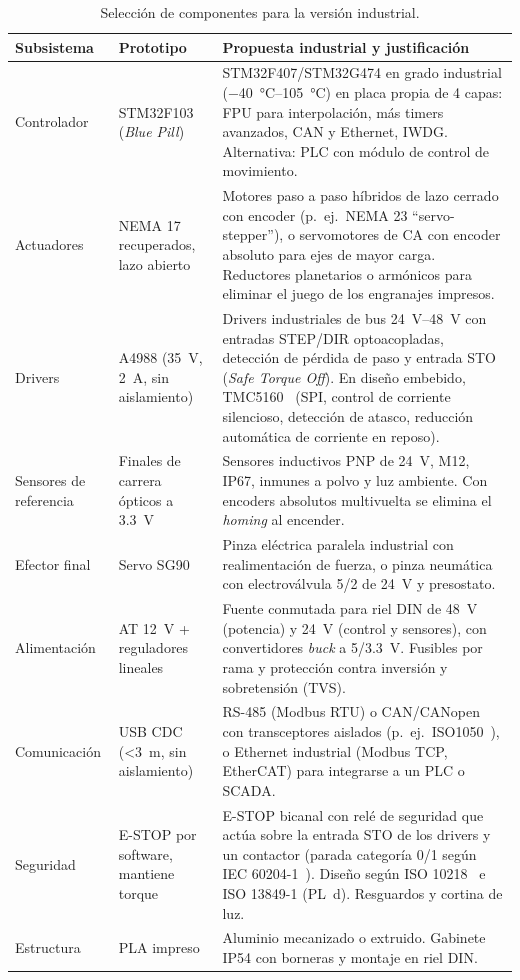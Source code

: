 \begin{table}[H]
\centering\footnotesize
\caption{Selección de componentes para la versión industrial.}\label{tab:producto}
\begin{tabularx}{\textwidth}{@{}p{2.1cm} p{3.0cm} X@{}}
\toprule
\textbf{Subsistema} & \textbf{Prototipo} & \textbf{Propuesta industrial y justificación}\\
\midrule
Controlador & STM32F103 (\emph{Blue Pill}) & STM32F407/STM32G474 en grado industrial (\SIrange{-40}{105}{\celsius}) en placa propia de 4 capas: FPU para interpolación, más timers avanzados, CAN y Ethernet, IWDG. Alternativa: PLC con módulo de control de movimiento.\\
Actuadores & NEMA 17 recuperados, lazo abierto & Motores paso a paso híbridos de lazo cerrado con encoder (p.~ej.\ NEMA 23 ``servo-stepper''), o servomotores de CA con encoder absoluto para ejes de mayor carga. Reductores planetarios o armónicos para eliminar el juego de los engranajes impresos.\\
Drivers & A4988 (\SI{35}{\volt}, \SI{2}{\ampere}, sin aislamiento) & Drivers industriales de bus \SIrange{24}{48}{\volt} con entradas STEP/DIR optoacopladas, detección de pérdida de paso y entrada STO (\emph{Safe Torque Off}). En diseño embebido, TMC5160~\cite{tmc5160} (SPI, control de corriente silencioso, detección de atasco, reducción automática de corriente en reposo).\\
Sensores de referencia & Finales de carrera ópticos a \SI{3,3}{\volt} & Sensores inductivos PNP de \SI{24}{\volt}, M12, IP67, inmunes a polvo y luz ambiente. Con encoders absolutos multivuelta se elimina el \emph{homing} al encender.\\
Efector final & Servo SG90 & Pinza eléctrica paralela industrial con realimentación de fuerza, o pinza neumática con electroválvula 5/2 de \SI{24}{\volt} y presostato.\\
Alimentación & AT \SI{12}{\volt} + reguladores lineales & Fuente conmutada para riel DIN de \SI{48}{\volt} (potencia) y \SI{24}{\volt} (control y sensores), con convertidores \emph{buck} a 5/\SI{3,3}{\volt}. Fusibles por rama y protección contra inversión y sobretensión (TVS).\\
Comunicación & USB CDC (\SI{<3}{\meter}, sin aislamiento) & RS-485 (Modbus RTU) o CAN/CANopen con transceptores aislados (p.~ej.\ ISO1050~\cite{iso1050}), o Ethernet industrial (Modbus TCP, EtherCAT) para integrarse a un PLC o SCADA.\\
Seguridad & E-STOP por software, mantiene torque & E-STOP bicanal con relé de seguridad que actúa sobre la entrada STO de los drivers y un contactor (parada categoría 0/1 según IEC 60204-1~\cite{iec60204}). Diseño según ISO 10218~\cite{iso10218} e ISO 13849-1 (PL~d). Resguardos y cortina de luz.\\
Estructura & PLA impreso & Aluminio mecanizado o extruido. Gabinete IP54 con borneras y montaje en riel DIN.\\
\bottomrule
\end{tabularx}
\end{table}

